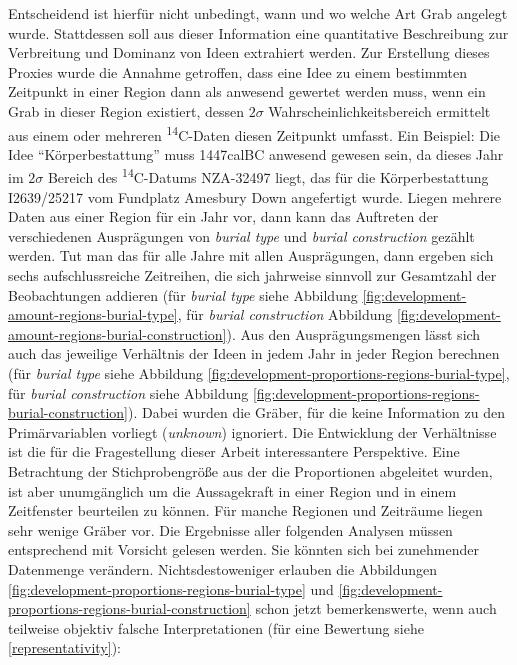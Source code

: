 \documentclass[openany,twoside,twocolumn]{book}
\begin{document}
Entscheidend ist hierfür nicht unbedingt, wann und wo welche Art Grab
angelegt wurde. Stattdessen soll aus dieser Information eine
quantitative Beschreibung zur Verbreitung und Dominanz von Ideen
extrahiert werden. Zur Erstellung dieses Proxies wurde die Annahme
getroffen, dass eine Idee zu einem bestimmten Zeitpunkt in einer Region
dann als anwesend gewertet werden muss, wenn ein Grab in dieser Region
existiert, dessen \(2\sigma\) Wahrscheinlichkeitsbereich ermittelt aus
einem oder mehreren \textsuperscript{14}C-Daten diesen Zeitpunkt
umfasst. Ein Beispiel: Die Idee ``Körperbestattung'' muss 1447calBC
anwesend gewesen sein, da dieses Jahr im \(2\sigma\) Bereich des
\textsuperscript{14}C-Datums NZA-32497 liegt, das für die
Körperbestattung I2639/25217 vom Fundplatz Amesbury Down angefertigt
wurde. Liegen mehrere Daten aus einer Region für ein Jahr vor, dann kann
das Auftreten der verschiedenen Ausprägungen von \emph{burial type} und
\emph{burial construction} gezählt werden. Tut man das für alle Jahre
mit allen Ausprägungen, dann ergeben sich sechs aufschlussreiche
Zeitreihen, die sich jahrweise sinnvoll zur Gesamtzahl der Beobachtungen
addieren (für \emph{burial type} siehe Abbildung
\ref{fig:development-amount-regions-burial-type}, für \emph{burial
construction} Abbildung
\ref{fig:development-amount-regions-burial-construction}). Aus den
Ausprägungsmengen lässt sich auch das jeweilige Verhältnis der Ideen in
jedem Jahr in jeder Region berechnen (für \emph{burial type} siehe
Abbildung \ref{fig:development-proportions-regions-burial-type}, für
\emph{burial construction} siehe Abbildung
\ref{fig:development-proportions-regions-burial-construction}). Dabei
wurden die Gräber, für die keine Information zu den Primärvariablen
vorliegt (\emph{unknown}) ignoriert. Die Entwicklung der Verhältnisse
ist die für die Fragestellung dieser Arbeit interessantere Perspektive.
Eine Betrachtung der Stichprobengröße aus der die Proportionen
abgeleitet wurden, ist aber unumgänglich um die Aussagekraft in einer
Region und in einem Zeitfenster beurteilen zu können. Für manche
Regionen und Zeiträume liegen sehr wenige Gräber vor. Die Ergebnisse
aller folgenden Analysen müssen entsprechend mit Vorsicht gelesen
werden. Sie könnten sich bei zunehmender Datenmenge verändern.
Nichtsdestoweniger erlauben die Abbildungen
\ref{fig:development-proportions-regions-burial-type} und
\ref{fig:development-proportions-regions-burial-construction} schon
jetzt bemerkenswerte, wenn auch teilweise objektiv falsche
Interpretationen (für eine Bewertung siehe \ref{representativity}):
\end{document}
